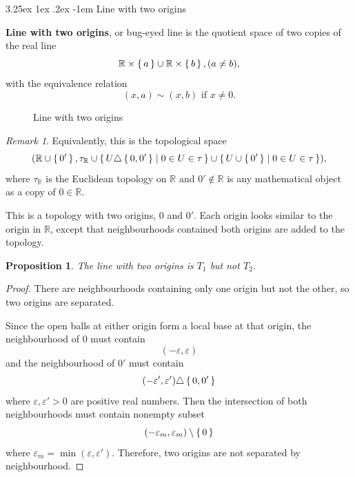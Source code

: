 \documentclass[12pt, letterpaper]{article}
\makeatletter
\renewcommand\subparagraph{\@startsection{subparagraph}{5}{\parindent}%
	{3.25ex \@plus1ex \@minus .2ex}%
	{0.75ex plus 0.1ex}%
	{\normalfont\normalsize\bfseries}}
\newcommand{\re}{\mathbb{R}}
\newtheorem{prop}{Proposition}[section]
\renewcommand\subparagraph{\@startsection{subparagraph}{5}{\parindent}%
	{3.25ex \@plus1ex \@minus .2ex}%
	{-1em}%
	{\normalfont\normalsize\bfseries}}
\theoremstyle{definition}
\theoremstyle{remark}
\newtheorem*{rem*}{Remark}
\theoremstyle{definition}
\theoremstyle{plain}
\numberwithin{equation}{section}
\makeatother
\begin{document}
	\subparagraph{Line with two origins}
	
	\begin{def*}
		\textbf{Line with two origins}, or bug-eyed line is the quotient space of two copies of the real line
		\[\re \times \set{a} \cup  \re\times\set{b}, (a\ne b), \]
		with the equivalence relation\[ (x,a)\sim (x,b) {\text{ if }}x\neq 0.\]
		\begin{figure}[H]
			\centering
			\caption{Line with two origins}
			\label{fig:line_with_two_origins}
		\end{figure}
	\end{def*}
	\begin{rem*}
		Equivalently, this is the topological space
		\[(\re\cup\set{0'} ,\tau_{\re} \cup \set{U\triangle \set{0,0'} | 0 \in U \in \tau }\cup \set{U\cup \set{0'} | 0 \in U \in \tau } ),\]
		where $\tau_{\re}$ is the Euclidean topology on $\re$ and $0'\notin\re$ is any mathematical object as a copy of $0\in\re$.
		
		This is a topology with two origins, $0$ and $0'$.
		Each origin looks similar to the origin in $\re$,
		except that neighbourhoods contained both origins are added to the topology.
		
	\end{rem*}

	\begin{prop}
		The line with two origins is $T_1$ but not $T_2$.
	\end{prop}
	\begin{proof}
		There are neighbourhoods containing only one origin but not the other, so two origins are separated.
		
		Since the open balls at either origin form a local base at that origin,
		the neighbourhood of $0$ must contain
		\[ (-\varepsilon,\varepsilon) \]
		and the neighbourhood of $0'$ must contain
		\[ (-\varepsilon',\varepsilon')\triangle\set{0,0'} \]
		where $\varepsilon,\varepsilon'>0$ are positive real numbers.
		Then the intersection of both neighbourhoods must contain nonempty subset
		\[ (-\varepsilon_m,\varepsilon_m)\setminus\set{0} \]
		where $\varepsilon_m=\min(\varepsilon,\varepsilon')$.
		Therefore, two origins are not separated by neighbourhood.
	\end{proof}
\end{document}
